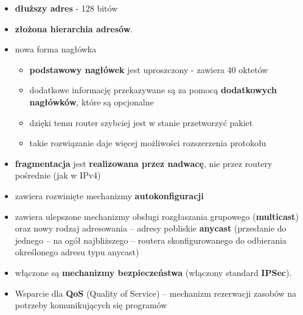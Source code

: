 \documentclass[../main.tex]{subfiles}
\begin{document}
    \begin{itemize}
        \item \textbf{dłuższy adres} - 128 bitów
        \item \textbf{złożona hierarchia adresów}.
        \item nowa forma nagłówka
        \begin{itemize}
            \item \textbf{podstawowy nagłówek} jest uproszczony - zawiera 40 oktetów
            \item dodatkowe informację przekazywane są za pomocą \textbf{dodatkowych nagłówków}, które są opcjonalne
            \item dzięki temu router szybciej jest w stanie przetworzyć pakiet
            \item takie rozwiązanie daje więcej możliwości rozszerzenia protokołu
        \end{itemize}
        \item \textbf{fragmentacja} jest \textbf{realizowana przez nadwacę}, nie przez routery pośrednie (jak w IPv4)
        \item zawiera rozwinięte mechanizmy \textbf{autokonfiguracji}
        \item zawiera ulepszone mechanizmy obsługi rozgłaszania grupowego (\textbf{multicast}) oraz nowy rodzaj adresowania – adresy pobliskie \textbf{anycast} (przesłanie do jednego – na ogół najbliższego – routera skonfigurowanego do odbierania określonego adresu typu anycast)
        \item włączone są \textbf{mechanizmy bezpieczeństwa} (włączony standard \textbf{IPSec}).
        \item Wsparcie dla \textbf{QoS} (Quality of Service) – mechanizm rezerwacji zasobów na potrzeby komunikujących się programów
    \end{itemize}
\end{document}
